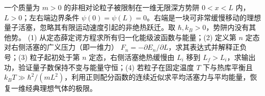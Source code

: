 一个质量为 \(m>0\) 的非相对论粒子被限制在一维无限深方势阱 \(0<x<L\) 内，\(L>0\)；左右端边界条件 \(\psi(0)=\psi(L)=0\)。右端是一块可非常缓慢移动的理想量子活塞，忽略其有限运动速度引起的非绝热跃迁。取 \(\hbar,k_B>0\)，势阱内没有其他势。
(1) 从定态薛定谔方程求所有归一化能级波函数与能量；(2) 定义第 \(n\) 定态对右侧活塞的广义压力（即一维力） \(F_n=-\partial E_n/\partial L\)，求其表达式并解释正负号；(3) 粒子起初处于第 \(n\) 定态，右侧活塞绝热缓慢由 \(L_i\) 移到 \(L_f>L_i\)，求输出功，验证量子数保持不变与能量守恒；(4) 若粒子在固定温度 \(T\) 下与热库平衡且 \(k_BT\gg\hbar^2/(mL^2)\)，利用正则配分函数的连续近似求平均活塞力与平均能量，恢复一维经典理想气体的极限。
